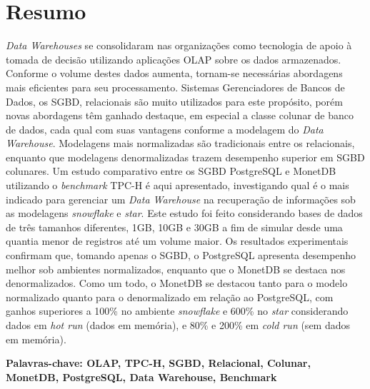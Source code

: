 
\chapter*{Resumo}

\noindent

\textit{Data Warehouses} se consolidaram nas organizações como tecnologia de apoio à tomada de decisão utilizando aplicações OLAP sobre os dados armazenados. Conforme o volume destes dados aumenta, tornam-se necessárias abordagens mais eficientes para seu processamento. Sistemas Gerenciadores de Bancos de Dados, os SGBD, relacionais são muito utilizados para este propósito, porém novas abordagens têm ganhado destaque, em especial a classe colunar de banco de dados, cada qual com suas vantagens conforme a modelagem do \textit{Data Warehouse}. Modelagens mais normalizadas são tradicionais entre os relacionais, enquanto que modelagens denormalizadas trazem desempenho superior em SGBD colunares. Um estudo comparativo entre os SGBD PostgreSQL e MonetDB utilizando o \textit{benchmark} TPC-H é aqui apresentado, investigando qual é o mais indicado para gerenciar um \textit{Data Warehouse} na recuperação de informações sob as modelagens \textit{snowflake} e \textit{star}. Este estudo foi feito considerando bases de dados de três tamanhos diferentes, 1GB, 10GB e 30GB a fim de simular desde uma quantia menor de registros até um volume maior. Os resultados experimentais confirmam que, tomando apenas o SGBD, o PostgreSQL apresenta desempenho melhor sob ambientes normalizados, enquanto que o MonetDB se destaca nos denormalizados. Como um todo, o MonetDB se destacou tanto para o modelo normalizado quanto para o denormalizado em relação ao PostgreSQL, com ganhos superiores a 100\% no ambiente \textit{snowflake} e 600\% no \textit{star} considerando dados em \textit{hot run} (dados em memória), e 80\% e 200\% em \textit{cold run} (sem dados em memória).


\vspace{1cm}
\noindent
\textbf{Palavras-chave: OLAP, TPC-H, SGBD, Relacional, Colunar, MonetDB, PostgreSQL, Data Warehouse, Benchmark}


